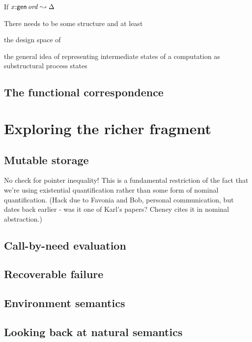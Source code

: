 \begin{theorem}
If $x{:}{\sf gen}\,{{\it ord}} \leadsto \Delta$
\end{theorem}

There needs to be some structure and
at least


the design space
of 

 the general idea
of representing intermediate states of a computation as 
substructural process states 



\subsection{The functional correspondence}



\section{Exploring the richer fragment}
\label{sec:richer-ordered-abstract}

\subsection{Mutable storage}
\label{sec:mutable-storage}

No check for pointer inequality! This is a fundamental restriction of
the fact that we're using existential quantification rather than some
form of nominal quantification. (Hack due to Favonia and Bob, personal
communication, but dates back earlier - was it one of Karl's papers?
Cheney cites it in nominal abstraction.)

\subsection{Call-by-need evaluation}

\subsection{Recoverable failure}

\subsection{Environment semantics}

\subsection{Looking back at natural semantics}
\label{sec:enriching-natsem}

